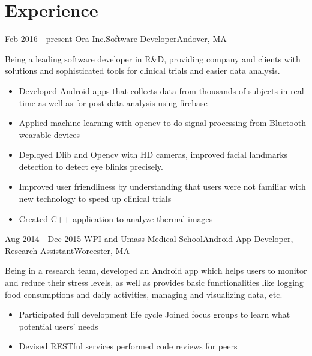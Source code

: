 \documentclass[10pt,a4paper,merriweather]{moderncv}        %
\begin{document}
\makecvtitle
\vspace{-1.5cm}

\section{Experience}

\cventry
{Feb 2016 - present}
{Ora Inc.}{Software Developer}{Andover, MA}{}
{Being a leading software developer in R\&D, providing company and clients with solutions and sophisticated tools for clinical trials and easier data analysis.
\begin{itemize}
\item Developed Android apps that collects data from thousands of subjects in real time as well as for post data analysis using firebase
\item Applied machine learning with opencv to do signal processing from Bluetooth wearable devices
\item Deployed Dlib and Opencv with HD cameras, improved facial landmarks detection to detect eye blinks precisely.
\item Improved user friendliness by understanding that users were not familiar with new technology to speed up clinical trials
\item Created C++ application  to analyze thermal images 
\end{itemize}}
\vspace{.15cm}

\cventry
{Aug 2014 - Dec 2015}
{WPI and Umass Medical School}{Android App Developer, Research Assistant}{Worcester, MA}{}
{Being in a research team, developed an Android app which helps users to monitor and reduce their stress levels, as well as provides basic functionalities like logging food consumptions and daily activities, managing and visualizing data, etc. 
\begin{itemize}
\item Participated full development life cycle 
\Item Joined focus groups to learn what potential users' needs
\item Devised RESTful services performed code reviews for peers
\end{itemize}}
\vspace{.15cm}
\end{document}
